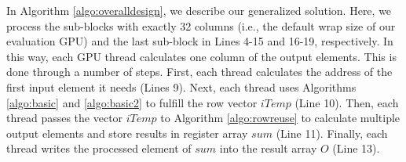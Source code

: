  In Algorithm \ref{algo:overalldesign}, we describe our generalized solution. Here, we process the sub-blocks with
exactly 32 columns (i.e., the default wrap size of our evaluation GPU) and the last sub-block in Lines 4-15 and 16-19, respectively. In
this way, each GPU thread calculates one column of the output elements. This is done through a number of steps. First, each thread
calculates the address of the first input element it needs (Lines 9). Next, each thread uses Algorithms \ref{algo:basic} and
\ref{algo:basic2} to fulfill the row vector $iTemp$ (Line 10). Then, each thread passes the vector $iTemp$ to Algorithm \ref{algo:rowreuse}
to calculate multiple output elements and store results in register array $sum$ (Line 11). Finally, each thread writes the processed
element of $sum$ into the result array $O$ (Line 13).
